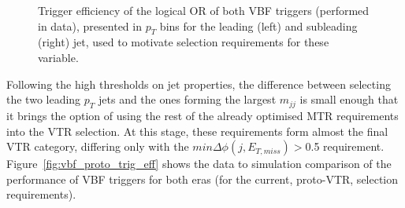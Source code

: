 \begin{figure}[htbp]
  \centering

  \caption{Trigger efficiency of the logical OR of both VBF triggers (performed in data), presented in $p_T$ bins for the leading (left) and subleading (right) jet, used to motivate selection requirements for these variable.}
  \label{fig:vbf_trig_pt_opt}
\end{figure}

\hspace{10pt} Following the high thresholds on jet properties, the difference between selecting the two leading $p_T$ jets and the ones forming the largest $m_{jj}$ is small enough that it brings the option of using the rest of the already optimised MTR requirements into the VTR selection. At this stage, these requirements form almost the final VTR category, differing only with the $min\Delta\phi(j, E_{T,miss})>$0.5 requirement. Figure~\ref{fig:vbf_proto_trig_eff} shows the data to simulation comparison of the performance of VBF triggers for both eras (for the current, proto-VTR, selection requirements).

